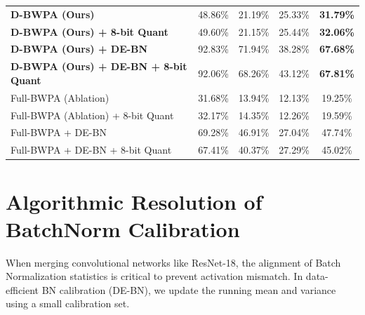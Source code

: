 \documentclass{article}
\theoremstyle{plain}
\theoremstyle{definition}
\theoremstyle{remark}
\begin{document}
\begin{table}[t]
\begin{center}
\begin{footnotesize}
\begin{sc}
\begin{tabular}{lcccc}
\midrule
\textbf{D-BWPA (Ours)} & 48.86\% & 21.19\% & 25.33\% & \textbf{31.79\%} \\
\textbf{D-BWPA (Ours) + 8-bit Quant} & 49.60\% & 21.15\% & 25.44\% & \textbf{32.06\%} \\
\textbf{D-BWPA (Ours) + DE-BN} & 92.83\% & 71.94\% & 38.28\% & \textbf{67.68\%} \\
\textbf{D-BWPA (Ours) + DE-BN + 8-bit Quant} & 92.06\% & 68.26\% & 43.12\% & \textbf{67.81\%} \\
\midrule
Full-BWPA (Ablation) & 31.68\% & 13.94\% & 12.13\% & 19.25\% \\
Full-BWPA (Ablation) + 8-bit Quant & 32.17\% & 14.35\% & 12.26\% & 19.59\% \\
Full-BWPA + DE-BN & 69.28\% & 46.91\% & 27.04\% & 47.74\% \\
Full-BWPA + DE-BN + 8-bit Quant & 67.41\% & 40.37\% & 27.29\% & 45.02\% \\
\bottomrule
\end{tabular}
\end{sc}
\end{footnotesize}
\end{center}
\vskip -0.15in
\end{table}

\section{Algorithmic Resolution of BatchNorm Calibration}
\label{sec:bn_cal}

When merging convolutional networks like ResNet-18, the alignment of Batch Normalization statistics is critical to prevent activation mismatch. In data-efficient BN calibration (DE-BN), we update the running mean and variance using a small calibration set.
\end{document}
